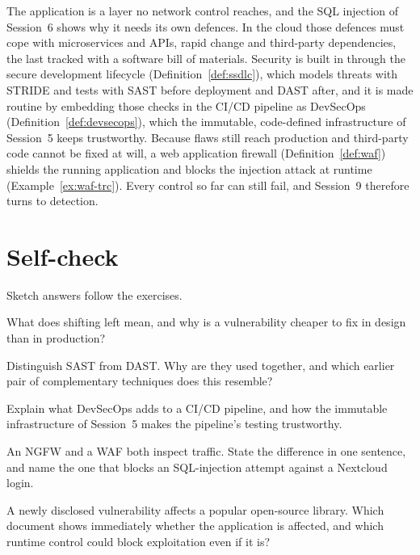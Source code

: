 The application is a layer no network control reaches, and the SQL
injection of Session~6 shows why it needs its own defences. In the cloud
those defences must cope with microservices and APIs, rapid change and
third-party dependencies, the last tracked with a software bill of
materials. Security is built in through the secure development lifecycle
(Definition~\ref{def:ssdlc}), which models threats with STRIDE and tests
with SAST before deployment and DAST after, and it is made routine by
embedding those checks in the CI/CD pipeline as DevSecOps
(Definition~\ref{def:devsecops}), which the immutable, code-defined
infrastructure of Session~5 keeps trustworthy. Because flaws still reach
production and third-party code cannot be fixed at will, a web application
firewall (Definition~\ref{def:waf}) shields the running application and
blocks the injection attack at runtime (Example~\ref{ex:waf-trc}). Every
control so far can still fail, and Session~9 therefore turns to detection.

\section*{Self-check}

Sketch answers follow the exercises.

\begin{exercise}
What does shifting left mean, and why is a vulnerability cheaper to fix in
design than in production?
\end{exercise}

\begin{exercise}
Distinguish SAST from DAST. Why are they used together, and which earlier
pair of complementary techniques does this resemble?
\end{exercise}

\begin{exercise}
Explain what DevSecOps adds to a CI/CD pipeline, and how the immutable
infrastructure of Session~5 makes the pipeline's testing trustworthy.
\end{exercise}

\begin{exercise}
An NGFW and a WAF both inspect traffic. State the difference in one sentence,
and name the one that blocks an SQL-injection attempt against a Nextcloud
login.
\end{exercise}

\begin{exercise}
A newly disclosed vulnerability affects a popular open-source library. Which
document shows immediately whether the application is affected, and which
runtime control could block exploitation even if it is?
\end{exercise}


